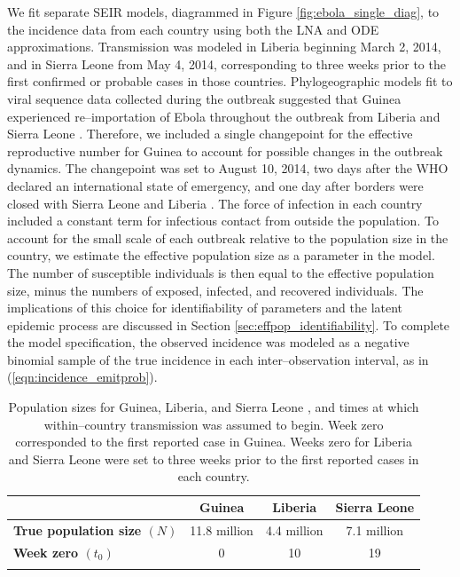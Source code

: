 We fit separate SEIR models, diagrammed in Figure \ref{fig:ebola_single_diag}, to the incidence data from each country using both the LNA and ODE approximations. Transmission was modeled in Liberia beginning March 2, 2014, and in Sierra Leone from May 4, 2014, corresponding to three weeks prior to the first confirmed or probable cases in those countries. Phylogeographic models fit to viral sequence data collected during the outbreak suggested that Guinea experienced re--importation of Ebola throughout the outbreak from Liberia and Sierra Leone \cite{dudas2017virus}. Therefore, we included a single changepoint for the effective reproductive number for Guinea to account for possible changes in the outbreak dynamics. The changepoint was set to August 10, 2014, two days after the WHO declared an international state of emergency, and one day after borders were closed with Sierra Leone and Liberia \cite{coltart2017ebola}. The force of infection in each country included a constant term for infectious contact from outside the population. To account for the small scale of each outbreak relative to the population size in the country, we estimate the effective population size as a parameter in the model. The number of susceptible individuals is then equal to the effective population size, minus the numbers of exposed, infected, and recovered individuals. The implications of this choice for identifiability of parameters and the latent epidemic process are discussed in Section \ref{sec:effpop_identifiability}. To complete the model specification, the observed incidence was modeled as a negative binomial sample of the true incidence in each inter--observation interval, as in (\ref{eqn:incidence_emitprob}).

\begin{table}[htbp]
	\caption[Population sizes for Guinea, Liberia, and Sierra Leone, along with times at which transmission was assumed to begin.]{Population sizes for Guinea, Liberia, and Sierra Leone \cite{un2017popdat}, and times at which within--country transmission was assumed to begin. Week zero corresponded to the first reported case in Guinea. Weeks zero for Liberia and Sierra Leone were set to three weeks prior to the first reported cases in each country.}
	\label{tab:ebola_pops_t0}
	\footnotesize
	\centering
	\begin{tabular}{lccc}	
		\hline	
		& \textbf{Guinea} & \textbf{Liberia} & \textbf{Sierra Leone} \\\hline
		\textbf{True population size $ (N)$} & 11.8 million & 4.4 million & 7.1 million \\ 
		\textbf{Week zero $ (t_0) $} & 0 & 10 & 19 \\
		\hline
		&&&
	\end{tabular} 
\end{table}

